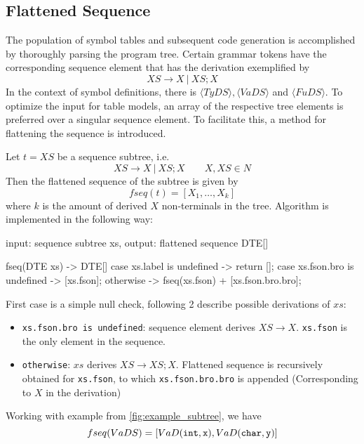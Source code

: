 \subsection{Flattened Sequence}\label{subsec:$fseq$}
The population of symbol tables and subsequent code generation is accomplished by thoroughly parsing the program tree.
Certain grammar tokens have the corresponding sequence element that has the derivation exemplified by
\[XS \to X\ |\ XS; X\]
In the context of symbol definitions, there is $\langle TyDS\rangle, \langle VaDS \rangle$ and $\langle FuDS \rangle$.
To optimize the input for table models, an array of the respective tree elements is preferred over a singular sequence element.
To facilitate this, a method for flattening the sequence is introduced.
\begin{definition}[fseq]
    Let $t = XS$ be a sequence subtree, i.e.
    \[XS \to X \ |\ XS;X\qquad X,XS\in N\]
    Then the flattened sequence of the subtree is given by
    \[fseq(t) = \left[X_1,\dots,X_k\right]\]
    where $k$ is the amount of derived $X$ non-terminals in the tree.
    Algorithm is implemented in the following way:
\end{definition}

\begin{codeblock}
    input: sequence subtree xs,
    output: flattened sequence DTE[]

    fseq(DTE xs) -> DTE[] {
        case xs.label is undefined -> return [];
        case xs.fson.bro is undefined -> [xs.fson];
        otherwise -> fseq(xs.fson) + [xs.fson.bro.bro];
    }
\end{codeblock}
First case is a simple null check, following 2 describe
possible derivations of $xs$:
\begin{itemize}
    \item \verb+xs.fson.bro is undefined+: sequence element derives $XS \to X$. \verb+xs.fson+ is the only
    element in the sequence.
    \item \verb+otherwise+: $xs$ derives $XS \to XS;X$.
    Flattened sequence is recursively obtained for \verb+xs.fson+, to which \verb+xs.fson.bro.bro+ is appended
    (Corresponding to $X$ in the derivation)
\end{itemize}
Working with example from \ref{fig:example_subtree}, we have
\[fseq(VaDS) = [VaD(\verb+int+, \verb+x+), VaD(\verb+char+, \verb+y+)]\]


